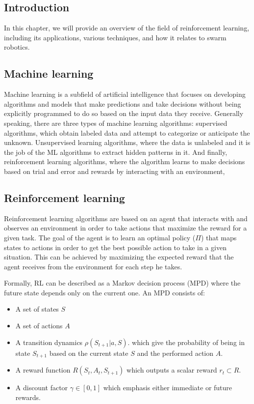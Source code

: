 \documentclass[12pt]{extarticle}
\begin{document}
\pagebreak

\subsection{Introduction}
In this chapter, we will provide an overview of the field of reinforcement learning, including its applications, various techniques, and how it relates to swarm robotics. 
\subsection{Machine learning}
Machine learning is a subfield of artificial intelligence that focuses on developing algorithms and models that make predictions and take decisions without being explicitly programmed to do so based on the input data they receive. Generally speaking, there are three types of machine learning algorithms: supervised algorithms, which obtain labeled data and attempt to categorize or anticipate the unknown. Unsupervised learning algorithms, where the data is unlabeled and it is the job of the ML algorithms to extract hidden patterns in it. And finally, reinforcement learning algorithms, where the algorithm learns to make decisions based on trial and error and rewards by interacting with an environment,

\subsection{Reinforcement learning}
Reinforcement learning algorithms are based on an agent that interacts with and observes an environment in order to take actions that maximize the reward for a given task.
The goal of the agent is to learn an optimal policy ($\Pi$) that maps states to actions in order to get the best possible action to take in a given situation. This can be achieved by maximizing the expected reward that the agent receives from the environment for each step he takes. \cite{arulkumaran2017brief}

Formally, RL can be described as a Markov decision process (MPD) where the future state depends only on the current one. An MPD consists of:

\begin{itemize}
  \item  A set of states $S$
  \item  A set of actions $A$
  \item  A transition dynamics $\rho(S_{t+1}|a,S)$. which give the probability of being in state $S_{t+1}$ based on the current state $S$ and the performed action $A$.
  \item A reward function $R(S_{t},A_{t},S_{t+1})$ which outputs a scalar reward $r_{t} \subset R$. 
   \item A discount factor $\gamma \in [0,1]$ which  emphasis either  immediate or future rewards.
\end{itemize}
\end{document}
